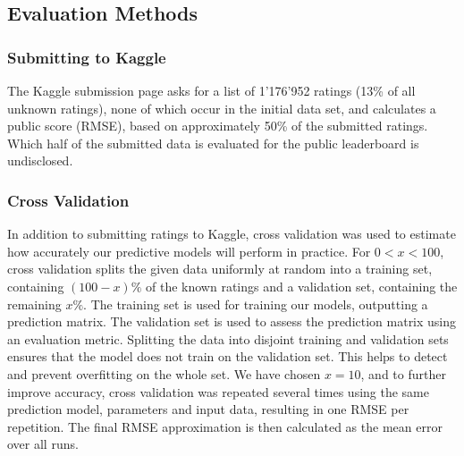 \subsection{Evaluation Methods}

\subsubsection{Submitting to Kaggle}

The Kaggle submission page asks for a list of 1'176'952 ratings (\raisebox{-0.7ex}{\~{}}13\% of all unknown ratings), none of which occur in the initial data set, and calculates a public score (\ac{RMSE}), based on approximately 50\% of the submitted ratings. Which half of the submitted data is evaluated for the public leaderboard is undisclosed.

\subsubsection{Cross Validation}

In addition to submitting ratings to Kaggle, cross validation was used to estimate how accurately our predictive models will perform in practice. For $0<x<100$, cross validation splits the given data uniformly at random into a training set, containing $(100-x)\%$ of the known ratings and a validation set, containing the remaining $x\%$. The training set is used for training our models, outputting a prediction matrix. The validation set is used to assess the prediction matrix using an evaluation metric. Splitting the data into disjoint training and validation sets ensures that the model does not train on the validation set. This helps to detect and prevent overfitting on the whole set. We have chosen $x=10$, and to further improve accuracy, cross validation was repeated several times using the same prediction model, parameters and input data, resulting in one \ac{RMSE} per repetition. The final \ac{RMSE} approximation is then calculated as the mean error over all runs.